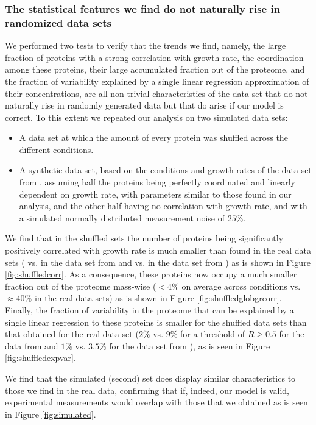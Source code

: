 \subsubsection{The statistical features we find do not naturally rise in randomized data sets}
\label{randanalysis}
We performed two tests to verify that the trends we find, namely, the large fraction of proteins with a strong correlation with growth rate, the coordination among these proteins, their large accumulated fraction out of the proteome, and the fraction of variability explained by a single linear regression approximation of their concentrations, are all non-trivial characteristics of the data set that do not naturally rise in randomly generated data but that do arise if our model is correct.
To this extent we repeated our analysis on two simulated data sets:
\begin{itemize}
\item A data set at which the amount of every protein was shuffled across the different conditions.
\item A synthetic data set, based on the conditions and growth rates of the data set from \cite{Heinemann2015}, assuming half the proteins being perfectly coordinated and linearly dependent on growth rate, with parameters similar to those found in our analysis, and the other half having no correlation with growth rate, and with a simulated normally distributed measurement noise of $25\%$.
\end{itemize}

We find that in the shuffled sets the number of proteins being significantly positively correlated with
growth rate is much smaller than found in the real data sets (\hGlobalShuff{} vs. \hGlobal{} in the data set from \cite{Heinemann2015} and \vGlobalShuff{} vs. \vGlobal{} in the data set from \cite{Peebo_2015}) as is shown in Figure \ref{fig:shuffledcorr}.
As a consequence, these proteins now occupy a much smaller fraction out of the proteome mass-wise ($<4\%$ on average across conditions vs. $\approx 40\%$ in the real data sets) as is shown in Figure \ref{fig:shuffledglobgrcorr}.
Finally, the fraction of variability in the proteome that can be explained by a single linear regression to these proteins is smaller for the shuffled data sets than that obtained for the real data set ($2\%$ vs. $9\%$ for a threshold of $R\ge0.5$ for the data from \cite{Heinemann2015} and $1\%$ vs. $3.5\%$ for the data set from \cite{Peebo_2015}), as is seen in Figure \ref{fig:shuffledexpvar}.

We find that the simulated (second) set does display similar characteristics to those we find in the real data, confirming that if, indeed, our model is valid, experimental measurements would overlap with those that we obtained as is seen in Figure \ref{fig:simulated}.